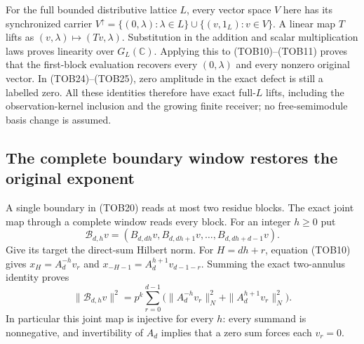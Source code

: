 For the full bounded distributive lattice $L$, every vector space
$V$ here has its synchronized carrier
$V^\uparrow=\{(0,\lambda):\lambda\in L\}\cup
\{(v,1_L):v\in V\}$. A linear map $T$ lifts as
$(v,\lambda)\mapsto(Tv,\lambda)$. Substitution in the addition
and scalar multiplication laws proves linearity over $G_L(\mathbb C)$.
Applying this to (TOB10)--(TOB11) proves that the first-block
evaluation recovers every $(0,\lambda)$ and every nonzero original
vector. In (TOB24)--(TOB25), zero amplitude in the exact defect is
still a labelled zero. All these identities therefore have exact
full-$L$ lifts, including the observation-kernel inclusion and the
growing finite receiver; no free-semimodule basis change is assumed.

\subsection{The complete boundary window restores the original exponent}

A single boundary in (TOB20) reads at most two residue blocks.
The exact joint map through a complete window reads every block.
For an integer $h\ge0$ put
\begin{equation}\tag{TOB26}
 \mathcal B_{d,h}v=(B_{d,dh}v,B_{d,dh+1}v,\ldots,
                              B_{d,dh+d-1}v).
\end{equation}
Give its target the direct-sum Hilbert norm. For $H=dh+r$,
equation (TOB10) gives
$x_H=A_d^{-h}v_r$ and
$x_{-H-1}=A_d^{h+1}v_{d-1-r}$. Summing the exact two-annulus
identity proves
\begin{equation}\tag{TOB27}
 \|\mathcal B_{d,h}v\|^2
 =p^k\sum_{r=0}^{d-1}
       \bigl(\|A_d^{-h}v_r\|_N^2+
                    \|A_d^{h+1}v_r\|_N^2\bigr).
\end{equation}
In particular this joint map is injective for every $h$: every
summand is nonnegative, and invertibility of $A_d$ implies that
a zero sum forces each $v_r=0$.

